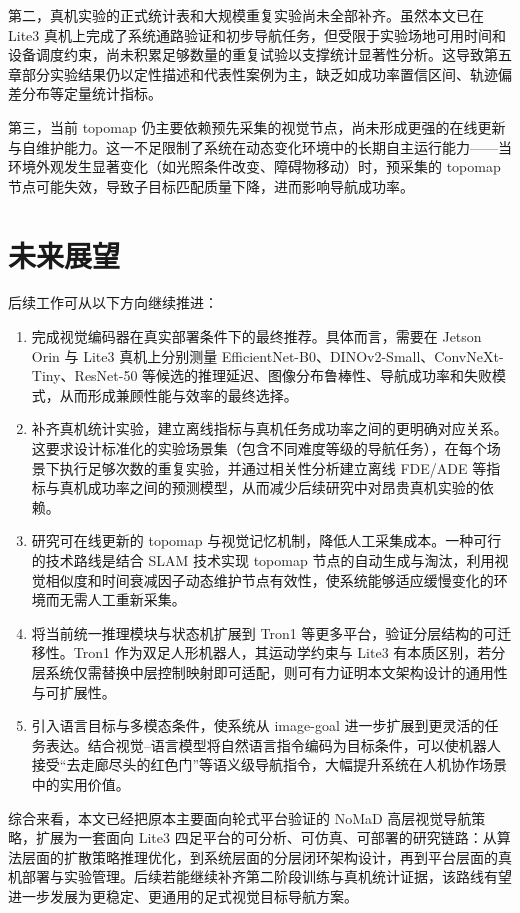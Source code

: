 第二，真机实验的正式统计表和大规模重复实验尚未全部补齐。虽然本文已在 Lite3 真机上完成了系统通路验证和初步导航任务，但受限于实验场地可用时间和设备调度约束，尚未积累足够数量的重复试验以支撑统计显著性分析。这导致第五章部分实验结果仍以定性描述和代表性案例为主，缺乏如成功率置信区间、轨迹偏差分布等定量统计指标。

第三，当前 topomap 仍主要依赖预先采集的视觉节点，尚未形成更强的在线更新与自维护能力。这一不足限制了系统在动态变化环境中的长期自主运行能力——当环境外观发生显著变化（如光照条件改变、障碍物移动）时，预采集的 topomap 节点可能失效，导致子目标匹配质量下降，进而影响导航成功率。

\section{未来展望}

后续工作可从以下方向继续推进：
\begin{enumerate}
    \item 完成视觉编码器在真实部署条件下的最终推荐。具体而言，需要在 Jetson Orin 与 Lite3 真机上分别测量 EfficientNet-B0、DINOv2-Small、ConvNeXt-Tiny、ResNet-50 等候选的推理延迟、图像分布鲁棒性、导航成功率和失败模式，从而形成兼顾性能与效率的最终选择。
    \item 补齐真机统计实验，建立离线指标与真机任务成功率之间的更明确对应关系。这要求设计标准化的实验场景集（包含不同难度等级的导航任务），在每个场景下执行足够次数的重复实验，并通过相关性分析建立离线 FDE/ADE 等指标与真机成功率之间的预测模型，从而减少后续研究中对昂贵真机实验的依赖。
    \item 研究可在线更新的 topomap 与视觉记忆机制，降低人工采集成本。一种可行的技术路线是结合 SLAM 技术\cite{orbslam3_2021}实现 topomap 节点的自动生成与淘汰，利用视觉相似度和时间衰减因子动态维护节点有效性，使系统能够适应缓慢变化的环境而无需人工重新采集。
    \item 将当前统一推理模块与状态机扩展到 Tron1 等更多平台，验证分层结构的可迁移性。Tron1 作为双足人形机器人，其运动学约束与 Lite3 有本质区别，若分层系统仅需替换中层控制映射即可适配，则可有力证明本文架构设计的通用性与可扩展性。
    \item 引入语言目标与多模态条件，使系统从 image-goal 进一步扩展到更灵活的任务表达。结合视觉--语言模型将自然语言指令编码为目标条件，可以使机器人接受``去走廊尽头的红色门''等语义级导航指令，大幅提升系统在人机协作场景中的实用价值。
\end{enumerate}

综合来看，本文已经把原本主要面向轮式平台验证的 NoMaD 高层视觉导航策略，扩展为一套面向 Lite3 四足平台的可分析、可仿真、可部署的研究链路：从算法层面的扩散策略推理优化，到系统层面的分层闭环架构设计，再到平台层面的真机部署与实验管理。后续若能继续补齐第二阶段训练与真机统计证据，该路线有望进一步发展为更稳定、更通用的足式视觉目标导航方案。

